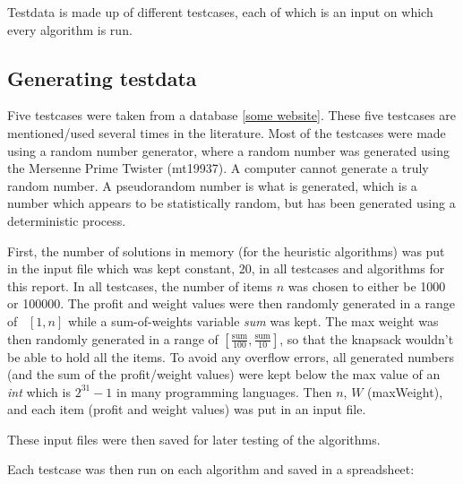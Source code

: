 \documentclass[titlepage]{article}
\begin{document}
Testdata is made up of different testcases, each of which is an input on which every algorithm is run.

\subsection{Generating testdata}

Five testcases were taken from a database \ref{some website}. These five testcases are mentioned/used several times in the literature.  Most of the testcases were made using a random number generator, where a random number was generated using the Mersenne Prime Twister (mt19937). A computer cannot generate a truly random number. A pseudorandom number is what is generated, which is a number which appears to be statistically random, but has been generated using a deterministic process. 

First, the number of solutions in memory (for the heuristic algorithms) was put in the input file which was kept constant, 20, in all testcases and algorithms for this report. In all testcases, the number of items $n$ was chosen to either be 1000 or 100000. The profit and weight values were then randomly generated in a range of \, $ [1, n] $ while a sum-of-weights variable \emph{sum} was kept. The max weight was then randomly generated in a range of $[\frac{\text{sum}}{100} , \frac{\text{sum}}{10}]$, so that the knapsack wouldn't be able to hold all the items. To avoid any overflow errors, all generated numbers (and the sum of the profit/weight values) were kept below the max value of an \emph{int} which is $2^{31}-1$ in many programming languages.  Then $n$, $W$ (maxWeight), and each item (profit and weight values) was put in an input file. 

These input files were then saved for later testing of the algorithms. 

Each testcase was then run on each algorithm and saved in a spreadsheet:



 
\end{document}
